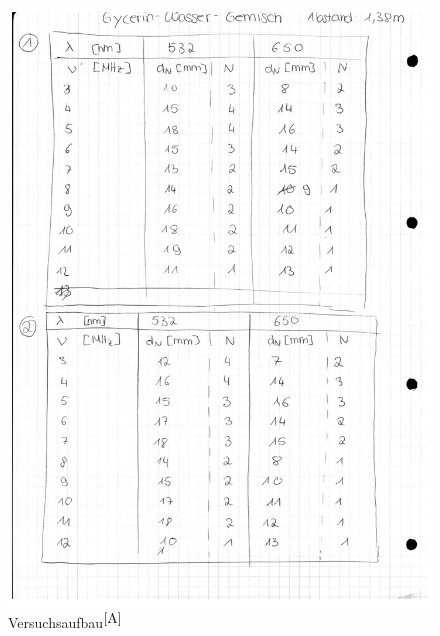 \documentclass[fontsize=12pt]{scrartcl}
\begin{document}
\begin{figure}[h]
\includegraphics[scale=0.8]{Graphik/S12b2}
\caption{Versuchsaufbau$^{\cite{A}}$}
\end{figure}
\end{document}
